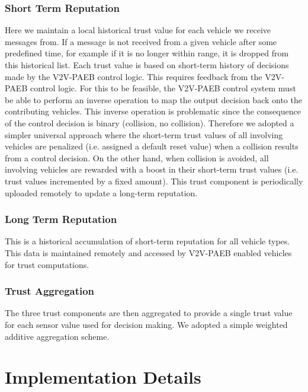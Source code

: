 \documentclass[conference]{IEEEtran}
\begin{document}
\subsubsection{Short Term Reputation}
Here we maintain a local historical trust value for each vehicle we receive messages from. If a message is not received from a given vehicle after some predefined time, for example if it is no longer within range, it is dropped from this historical list. Each trust value is based on short-term history of decisions made by the V2V-PAEB control logic. This requires feedback from the V2V-PAEB control logic. For this to be feasible, the V2V-PAEB control system must be able to perform an inverse operation to map the output decision back onto the contributing vehicles. This inverse operation is problematic since the consequence of the control decision is binary (collision, no collision). Therefore we adopted a simpler universal approach where the short-term trust values of all involving vehicles are penalized (i.e. assigned a default reset value) when a collision results from a control decision. On the other hand, when collision is avoided, all involving vehicles are rewarded with a boost in their short-term trust values (i.e. trust values incremented by a fixed amount). This trust component is periodically uploaded remotely to update a long-term reputation.

\subsubsection{Long Term Reputation}
This is a historical accumulation of short-term reputation for all vehicle types. This data is maintained remotely and accessed by V2V-PAEB enabled vehicles for trust computations.

\subsubsection{Trust Aggregation}
The three trust components are then aggregated to provide a single trust value for each sensor value used for decision making. We adopted a simple weighted additive aggregation scheme.

\section{Implementation Details}
\end{document}
